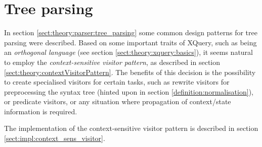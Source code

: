 \section{Tree parsing}
\label{sect:method:tree_parsing}
In section \ref{sect:theory:parser:tree_parsing} some common design patterns
for tree parsing were described. Based on some important traits of XQuery, such
as being an \textit{orthogonal language} (see section
\ref{sect:theory:xquery:basics}), it seems natural to employ the
\textit{context-sensitive visitor pattern}, as described in section
\ref{sect:theory:contextVisitorPattern}. The benefits of this decision is the
possibility to create specialised visitors for certain tasks, such as rewrite
visitors for preprocessing the syntax tree (hinted upon in section
\ref{definition:normalisation}), or predicate visitors, or any situation where
propagation of context/state information is required.

The implementation of the context-sensitive visitor pattern is described in
section \ref{sect:impl:context_sens_visitor}. 
